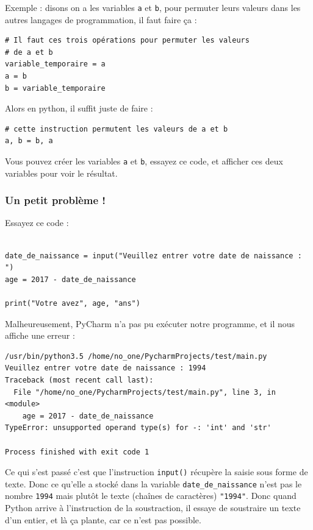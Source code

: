 \documentclass[12pt]{article}
\newcommand{\code}[1]{\colorbox{light-gray}{\texttt{#1}}}
\begin{document}
            Exemple : disons on a les variables \code{a} et
            \code{b}, pour permuter leurs valeurs dans les autres langages de programmation, il faut faire ça :
            \begin{lstlisting}[style=code]
# Il faut ces trois opérations pour permuter les valeurs
# de a et b
variable_temporaire = a
a = b
b = variable_temporaire
            \end{lstlisting}

            Alors en python, il suffit juste de faire :
            \begin{lstlisting}[style=code]
# cette instruction permutent les valeurs de a et b
a, b = b, a
            \end{lstlisting}

            Vous pouvez créer les variables \code{a} et \code{b}, essayez ce code, et afficher ces deux variables
            pour voir le résultat.
        \subsubsection{Un petit problème !}
            Essayez ce code :
            \begin{lstlisting}[style=code, breaklines=false]

date_de_naissance = input("Veuillez entrer votre date de naissance : ")
age = 2017 - date_de_naissance

print("Votre avez", age, "ans")
            \end{lstlisting}

            Malheureusement, PyCharm n'a pas pu exécuter notre programme, et il nous affiche une erreur :
            \begin{lstlisting}[style=exec_result]
/usr/bin/python3.5 /home/no_one/PycharmProjects/test/main.py
Veuillez entrer votre date de naissance : 1994
Traceback (most recent call last):
  File "/home/no_one/PycharmProjects/test/main.py", line 3, in <module>
    age = 2017 - date_de_naissance
TypeError: unsupported operand type(s) for -: 'int' and 'str'

Process finished with exit code 1
            \end{lstlisting}

            Ce qui s'est passé c'est que l'instruction \code{input()} récupère la saisie sous forme de texte. Donc
            ce qu'elle a stocké dans la variable \code{date\_de\_naissance} n'est pas le nombre \code{1994} mais plutôt
            le texte (chaînes de caractères) \code{"1994"}. Donc quand Python arrive à l'instruction de la soustraction,
            il essaye de soustraire un texte d'un entier, et là ça plante, car ce n'est pas possible.
\end{document}
